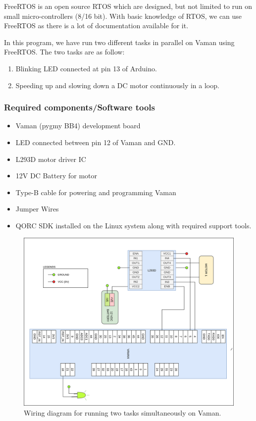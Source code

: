 FreeRTOS is an open source RTOS which are designed, but not limited to run on small micro-controllers (8/16 bit). With basic knowledge of RTOS, we can use FreeRTOS as there is a lot of documentation available for it.

In this program, we have run two different tasks in parallel on Vaman using FreeRTOS. The two tasks are as follow:
\begin{enumerate}
    \item Blinking LED connected at pin 13 of Arduino.
    \item Speeding up and slowing down a DC motor continuously in a loop.
\end{enumerate}

\subsubsection{Required components/Software tools}
\begin{itemize}
    \item Vaman (pygmy BB4) development board
    \item LED connected between pin 12 of Vaman and GND.
    \item L293D motor driver IC
    \item 12V DC Battery for motor
    \item Type-B cable for powering and programming Vaman
    \item Jumper Wires
    \item QORC SDK installed on the Linux system along with required support tools.
\end{itemize}

\begin{figure}[ht]
\centering
\includegraphics[width=\columnwidth]{./Figures/Wiring_FreeRTOS_demo_vaman.png}
\caption{Wiring diagram for running two tasks simultaneously on Vaman.}
\label{Wiring_FreeRTOS_demo_vaman}
\end{figure}

